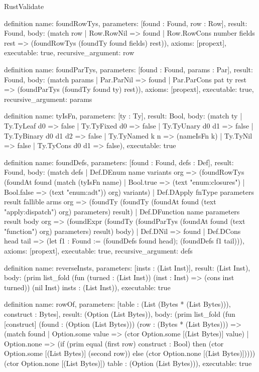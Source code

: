 \begin{lexlean}{RustValidate}
\begin{semanticmodule}
definition{
  name: foundRowTys,
  parameters: [found : Found, row : Row],
  result: Found,
  body: (match row
    | Row.RowNil => found
    | Row.RowCons number fields rest => (foundRowTys (foundTy found fields) rest)),
  axioms: [propext],
  executable: true,
  recursive_argument: row
}

definition{
  name: foundParTys,
  parameters: [found : Found, params : Par],
  result: Found,
  body: (match params
    | Par.ParNil => found
    | Par.ParCons pat ty rest => (foundParTys (foundTy found ty) rest)),
  axioms: [propext],
  executable: true,
  recursive_argument: params
}

definition{
  name: tyIsFn,
  parameters: [ty : Ty],
  result: Bool,
  body: (match ty
    | Ty.TyLeaf d0 => false
    | Ty.TyFixed d0 => false
    | Ty.TyUnary d0 d1 => false
    | Ty.TyBinary d0 d1 d2 => false
    | Ty.TyNamed k n => (nameIsFn k)
    | Ty.TyNil => false
    | Ty.TyCons d0 d1 => false),
  executable: true
}

definition{
  name: foundDefs,
  parameters: [found : Found, defs : Def],
  result: Found,
  body: (match defs
    | Def.DEnum name variants org => (foundRowTys (foundAt found (match (tyIsFn name)
      | Bool.true => (text "enum:closures")
      | Bool.false => (text "enum:adt")) org) variants)
    | Def.DApply fnType parameters result fallible arms org => (foundTy (foundTy (foundAt found (text "apply:dispatch") org) parameters) result)
    | Def.DFunction name parameters result body org => (foundExpr (foundTy (foundParTys (foundAt found (text "function") org) parameters) result) body)
    | Def.DNil => found
    | Def.DCons head tail => (let f1 : Found := (foundDefs found head); (foundDefs f1 tail))),
  axioms: [propext],
  executable: true,
  recursive_argument: defs
}

definition{
  name: reverseInsts,
  parameters: [insts : (List Inst)],
  result: (List Inst),
  body: (prim list_fold (fun (turned : (List Inst)) (inst : Inst) => (cons inst turned)) (nil Inst) insts : (List Inst)),
  executable: true
}

definition{
  name: rowOf,
  parameters: [table : (List (Bytes * (List Bytes))), construct : Bytes],
  result: (Option (List Bytes)),
  body: (prim list_fold (fun [construct] (found : (Option (List Bytes))) (row : (Bytes * (List Bytes))) => (match found
    | Option.some value => (ctor Option.some [(List Bytes)] value)
    | Option.none => (if (prim equal (first row) construct : Bool) then (ctor Option.some [(List Bytes)] (second row)) else (ctor Option.none [(List Bytes)])))) (ctor Option.none [(List Bytes)]) table : (Option (List Bytes))),
  executable: true
}


\end{semanticmodule}
\end{lexlean}

